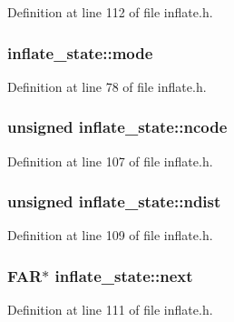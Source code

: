 Definition at line 112 of file inflate.\-h.

\hypertarget{structinflate__state_a9c7906fee7eeeb450b13576531ca639d}{
\subsubsection[{mode}]{ inflate\-\_\-state\-::mode}}\label{structinflate__state_a9c7906fee7eeeb450b13576531ca639d}


Definition at line 78 of file inflate.\-h.

\hypertarget{structinflate__state_a62b5ea8559856b315b6c89d9114c2109}{
\subsubsection[{ncode}]{\setlength{\rightskip}{0pt plus 5cm}unsigned inflate\-\_\-state\-::ncode}}\label{structinflate__state_a62b5ea8559856b315b6c89d9114c2109}


Definition at line 107 of file inflate.\-h.

\hypertarget{structinflate__state_a4415e5e51efdd0c8672e4c601caa4762}{
\subsubsection[{ndist}]{\setlength{\rightskip}{0pt plus 5cm}unsigned inflate\-\_\-state\-::ndist}}\label{structinflate__state_a4415e5e51efdd0c8672e4c601caa4762}


Definition at line 109 of file inflate.\-h.

\hypertarget{structinflate__state_a872bf267d91efb4143e9cfb812e670bb}{
\subsubsection[{next}]{ F\-A\-R$\ast$ inflate\-\_\-state\-::next}}\label{structinflate__state_a872bf267d91efb4143e9cfb812e670bb}


Definition at line 111 of file inflate.\-h.

